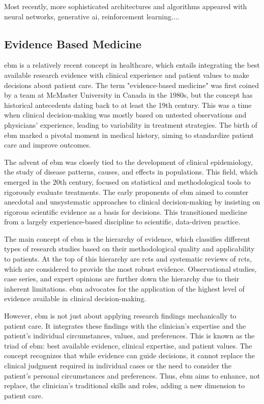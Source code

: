 Most recently, more sophisticated architectures and algorithms appeared with neural networks, generative \ac{ai}, reinforcement learning....





\subsection{Evidence Based Medicine}
\ac{ebm} is a relatively recent concept in healthcare, which entails integrating the best available research evidence with clinical experience and patient values to make decisions about patient care. The term "evidence-based medicine" was first coined by a team at McMaster University in Canada in the 1980s, but the concept has historical antecedents dating back to at least the 19th century. This was a time when clinical decision-making was mostly based on untested observations and physicians' experience, leading to variability in treatment strategies. The birth of \ac{ebm} marked a pivotal moment in medical history, aiming to standardize patient care and improve outcomes.

The advent of \ac{ebm} was closely tied to the development of clinical epidemiology, the study of disease patterns, causes, and effects in populations. This field, which emerged in the 20th century, focused on statistical and methodological tools to rigorously evaluate treatments. The early proponents of \ac{ebm} aimed to counter anecdotal and unsystematic approaches to clinical decision-making by insisting on rigorous scientific evidence as a basis for decisions. This transitioned medicine from a largely experience-based discipline to scientific, data-driven practice.

The main concept of \ac{ebm} is the hierarchy of evidence, which classifies different types of research studies based on their methodological quality and applicability to patients. At the top of this hierarchy are \acp{rct} and systematic reviews of \acp{rct}, which are considered to provide the most robust evidence. Observational studies, case series, and expert opinions are further down the hierarchy due to their inherent limitations. \ac{ebm} advocates for the application of the highest level of evidence available in clinical decision-making.

However, \ac{ebm} is not just about applying research findings mechanically to patient care. It integrates these findings with the clinician's expertise and the patient's individual circumstances, values, and preferences. This is known as the triad of \ac{ebm}: best available evidence, clinical expertise, and patient values. The concept recognizes that while evidence can guide decisions, it cannot replace the clinical judgment required in individual cases or the need to consider the patient's personal circumstances and preferences. Thus, \ac{ebm} aims to enhance, not replace, the clinician's traditional skills and roles, adding a new dimension to patient care.


